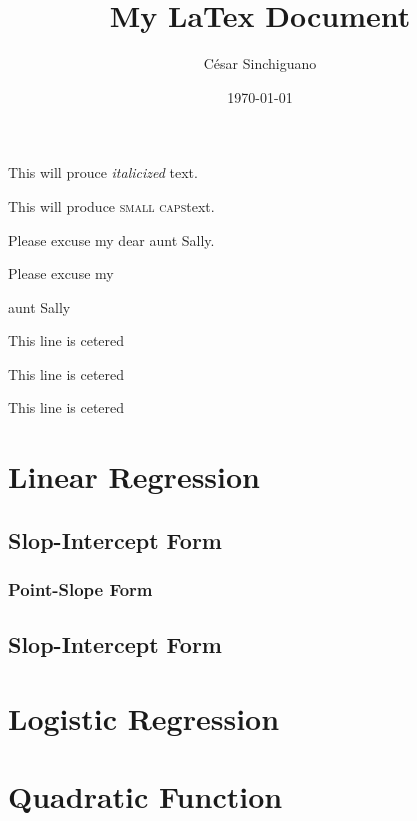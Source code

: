 \documentclass[11pt]{article}
\title{My LaTex Document}
\author{César Sinchiguano}
\date{\today}
\begin{document}
\tableofcontents
\maketitle



This will prouce \textit{italicized} text.


This will produce \textsc{small caps}text.

Please excuse my dear aunt Sally.
\vspace{1cm}



Please excuse my \begin{large}aunt Sally
\end{large}



\vspace{1cm}

\center
\begin{center}
This line is cetered 
\end{center}

\begin{flushleft}
This line is cetered 
\end{flushleft}


\begin{flushright}
This line is cetered 
\end{flushright}

\section{Linear Regression}
	\subsection{Slop-Intercept Form}
		\subsubsection{Point-Slope Form}
	\subsection{Slop-Intercept Form}
\section{Logistic Regression}
\section{Quadratic Function}
\end{document}
